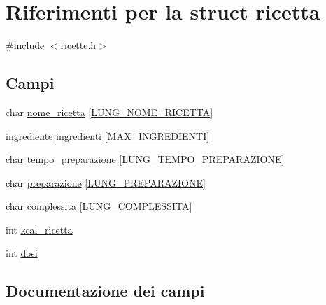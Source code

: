 \hypertarget{structricetta}{}\section{Riferimenti per la struct ricetta}
\label{structricetta}


{\ttfamily \#include $<$ricette.\+h$>$}

\subsection*{Campi}
\begin{DoxyCompactItemize}
\item 
char \hyperlink{structricetta_a40bb51c26dc338c485cc655bea2c2ca5}{nome\+\_\+ricetta} \mbox{[}\hyperlink{ricette_8h_aacd065596f33b6510fa58f8ba4dea542}{L\+U\+N\+G\+\_\+\+N\+O\+M\+E\+\_\+\+R\+I\+C\+E\+T\+TA}\mbox{]}
\item 
\hyperlink{structingrediente}{ingrediente} \hyperlink{structricetta_ac8567e615af6b01c27b2aea1fc81c50f}{ingredienti} \mbox{[}\hyperlink{ricette_8h_a3f37fa2abc5ee352f9a922ef72b80116}{M\+A\+X\+\_\+\+I\+N\+G\+R\+E\+D\+I\+E\+N\+TI}\mbox{]}
\item 
char \hyperlink{structricetta_aa7c5427cccd26a39a8c7a34050eea6be}{tempo\+\_\+preparazione} \mbox{[}\hyperlink{ricette_8h_a711f3911a37877bbfa09796364e391ab}{L\+U\+N\+G\+\_\+\+T\+E\+M\+P\+O\+\_\+\+P\+R\+E\+P\+A\+R\+A\+Z\+I\+O\+NE}\mbox{]}
\item 
char \hyperlink{structricetta_a8c769fcee937b4b060b796a2ae2c1086}{preparazione} \mbox{[}\hyperlink{ricette_8h_abdbfa8d79884434777eae730867d54cd}{L\+U\+N\+G\+\_\+\+P\+R\+E\+P\+A\+R\+A\+Z\+I\+O\+NE}\mbox{]}
\item 
char \hyperlink{structricetta_ad991258e93efcc820a11f9a1a2e0f079}{complessita} \mbox{[}\hyperlink{ricette_8h_afdcfe3df8eca40e79c8d2854a52acbb0}{L\+U\+N\+G\+\_\+\+C\+O\+M\+P\+L\+E\+S\+S\+I\+TA}\mbox{]}
\item 
int \hyperlink{structricetta_abdd39d8054927daf2a648aef9aea1909}{kcal\+\_\+ricetta}
\item 
int \hyperlink{structricetta_abbc9584ea1555c9642adbe72ffb2f9bd}{dosi}
\end{DoxyCompactItemize}


\subsection{Documentazione dei campi}
\mbox{\label{structricetta_ad991258e93efcc820a11f9a1a2e0f079}} 
